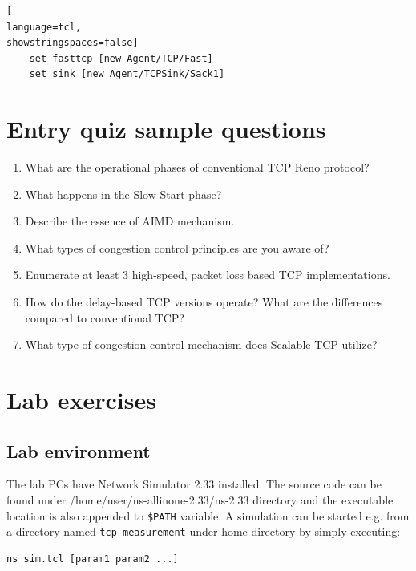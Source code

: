 \documentclass[a4paper]{article}
\begin{document}
\begin{lstlisting}[
language=tcl,
showstringspaces=false]
    set fasttcp [new Agent/TCP/Fast]
    set sink [new Agent/TCPSink/Sack1]
\end{lstlisting}




\appendix

\section{Entry quiz sample questions}

\begin{enumerate}
    \item What are the operational phases of conventional TCP Reno protocol?
    \item What happens in the Slow Start phase?
    \item Describe the essence of AIMD mechanism.
    \item What types of congestion control principles are you aware of?
    \item Enumerate at least 3 high-speed, packet loss based TCP implementations.
    \item How do the delay-based TCP versions operate? What are the differences compared to conventional TCP?
    \item What type of congestion control mechanism does Scalable TCP utilize?
\end{enumerate}

\section{Lab exercises}

\subsection{Lab environment}

The lab PCs have Network Simulator 2.33 installed. The source code can be found
under /home/user/ns-allinone-2.33/ns-2.33 directory and the executable location is also
appended to \verb!$PATH! variable.
A simulation can be started e.g. from a directory named \verb!tcp-measurement! under home directory
by simply executing:

\begin{lstlisting}[language=bash]
ns sim.tcl [param1 param2 ...]
\end{lstlisting}
\end{document}
